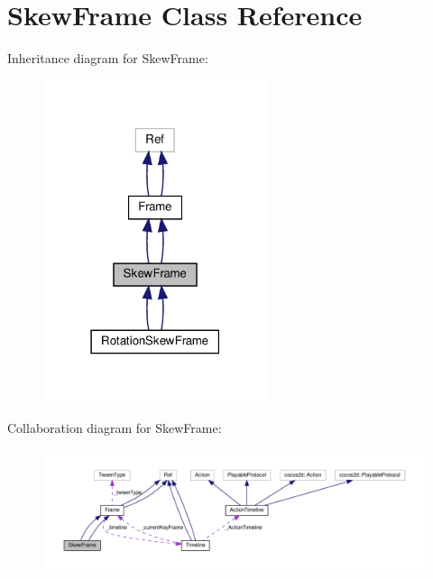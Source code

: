 \hypertarget{classSkewFrame}{}\section{Skew\+Frame Class Reference}
\label{classSkewFrame}


Inheritance diagram for Skew\+Frame\+:
\nopagebreak
\begin{figure}[H]
\begin{center}
\leavevmode
\includegraphics[width=186pt]{classSkewFrame__inherit__graph}
\end{center}
\end{figure}


Collaboration diagram for Skew\+Frame\+:
\nopagebreak
\begin{figure}[H]
\begin{center}
\leavevmode
\includegraphics[width=350pt]{classSkewFrame__coll__graph}
\end{center}
\end{figure}
